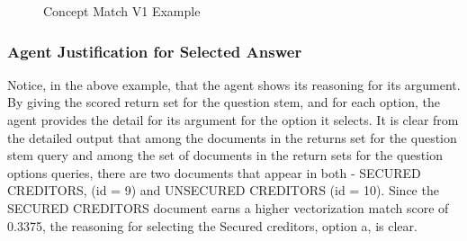 \begin{figure}
\centering
\vspace{1.0in}
\caption{Concept Match V1 Example}
\label{fig:concept_match_v1_example}
\end{figure}


\subsubsection{Agent Justification for Selected Answer}

Notice, in the above example, that the agent shows its reasoning for its argument.  By giving the scored return set for the question stem, and for each option, the agent provides the detail for its argument for the option it selects.  It is clear from the detailed output that among the documents in the returns set for the question stem query and among the set of documents in the return sets for the question options queries, there are two documents that appear in both - SECURED CREDITORS, (id = 9) and UNSECURED CREDITORS (id = 10).  Since the SECURED CREDITORS document earns a higher vectorization match score of 0.3375, the reasoning for selecting the Secured creditors, option a, is clear.

